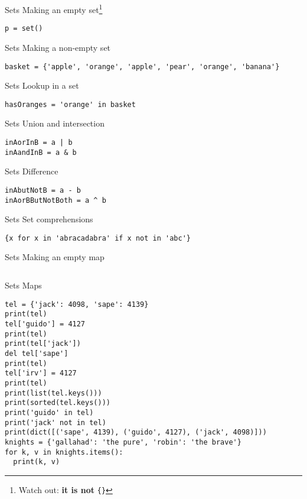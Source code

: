 \documentclass{beamer}
\begin{document}
\begin{frame}[fragile]{Sets}
Making an empty set\footnote{Watch out: \textbf{it is not} \texttt{\{\}}}
\begin{lstlisting}
p = set()
\end{lstlisting}
\end{frame}

\begin{frame}[fragile]{Sets}
Making a non-empty set
\begin{lstlisting}
basket = {'apple', 'orange', 'apple', 'pear', 'orange', 'banana'}
\end{lstlisting}
\end{frame}

\begin{frame}[fragile]{Sets}
Lookup in a set
\begin{lstlisting}
hasOranges = 'orange' in basket
\end{lstlisting}
\end{frame}

\begin{frame}[fragile]{Sets}
Union and intersection
\begin{lstlisting}
inAorInB = a | b
inAandInB = a & b
\end{lstlisting}
\end{frame}

\begin{frame}[fragile]{Sets}
Difference
\begin{lstlisting}
inAbutNotB = a - b
inAorBButNotBoth = a ^ b
\end{lstlisting}
\end{frame}

\begin{frame}[fragile]{Sets}
Set comprehensions
\begin{lstlisting}
{x for x in 'abracadabra' if x not in 'abc'}
\end{lstlisting}
\end{frame}

\begin{frame}[fragile]{Sets}
Making an empty map
\begin{lstlisting}

\end{lstlisting}
\end{frame}

\begin{frame}[fragile]{Sets}
Maps
\begin{lstlisting}
tel = {'jack': 4098, 'sape': 4139}
print(tel)
tel['guido'] = 4127
print(tel)
print(tel['jack'])
del tel['sape']
print(tel)
tel['irv'] = 4127
print(tel)
print(list(tel.keys()))
print(sorted(tel.keys()))
print('guido' in tel)
print('jack' not in tel)
print(dict([('sape', 4139), ('guido', 4127), ('jack', 4098)]))
knights = {'gallahad': 'the pure', 'robin': 'the brave'}
for k, v in knights.items():
  print(k, v)
\end{lstlisting}
\end{frame}
\end{document}
